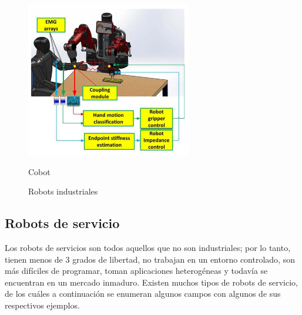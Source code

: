 \begin{figure}[ht!]
\begin{minipage}{0.44\linewidth}
	\end{minipage}
	\hspace{1cm}
	\begin{minipage}{0.4\linewidth}
		\centering
		\includegraphics[width=\linewidth]{figs/cobot.png}
		\caption*{\centering Cobot}
		
	\end{minipage}
	\caption{Robots industriales}
	\label{fig:robindustriales}
\end{figure}

\setcounter{footnote}{5} %


\subsection{Robots de servicio}
\label{subsec:robotservicio}

Los robots de servicios son todos aquellos que no son industriales; por lo tanto, tienen menos de 3 grados de libertad, no trabajan en un entorno controlado, son más difíciles de programar, toman aplicaciones heterogéneas y todavía se encuentran en un mercado inmaduro. Existen muchos tipos de robots de servicio, de los cuáles a continuación se enumeran algunos campos con algunos de sus respectivos ejemplos.



